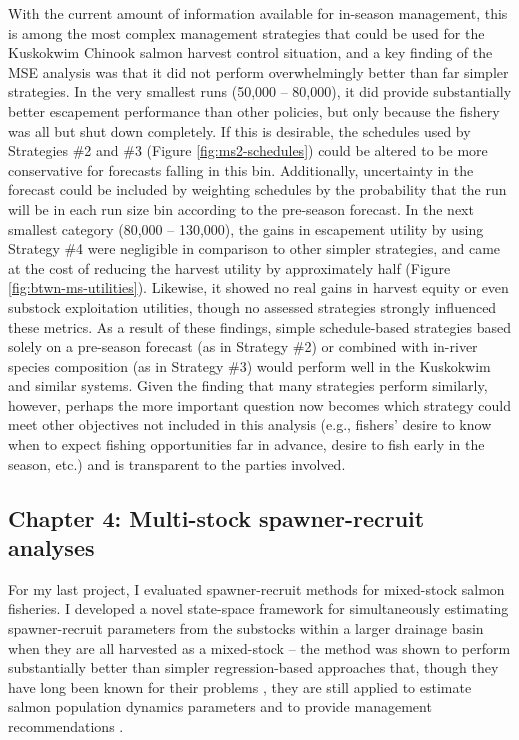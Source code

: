 \documentclass[12pt,]{book}
\theoremstyle{definition}
\theoremstyle{definition}
\theoremstyle{definition}
\theoremstyle{remark}
\begin{document}
With the current amount of information available for in-season
management, this is among the most complex management strategies that
could be used for the Kuskokwim Chinook salmon harvest control
situation, and a key finding of the MSE analysis was that it did not
perform overwhelmingly better than far simpler strategies. In the very
smallest runs (50,000 -- 80,000), it did provide substantially better
escapement performance than other policies, but only because the fishery
was all but shut down completely. If this is desirable, the schedules
used by Strategies \#2 and \#3 (Figure \ref{fig:ms2-schedules}) could be
altered to be more conservative for forecasts falling in this bin.
Additionally, uncertainty in the forecast could be included by weighting
schedules by the probability that the run will be in each run size bin
according to the pre-season forecast. In the next smallest category
(80,000 -- 130,000), the gains in escapement utility by using Strategy
\#4 were negligible in comparison to other simpler strategies, and came
at the cost of reducing the harvest utility by approximately half
(Figure \ref{fig:btwn-ms-utilities}). Likewise, it showed no real gains
in harvest equity or even substock exploitation utilities, though no
assessed strategies strongly influenced these metrics. As a result of
these findings, simple schedule-based strategies based solely on a
pre-season forecast (as in Strategy \#2) or combined with in-river
species composition (as in Strategy \#3) would perform well in the
Kuskokwim and similar systems. Given the finding that many strategies
perform similarly, however, perhaps the more important question now
becomes which strategy could meet other objectives not included in this
analysis (e.g., fishers' desire to know when to expect fishing
opportunities far in advance, desire to fish early in the season, etc.)
and is transparent to the parties involved.

\subsection{Chapter 4: Multi-stock spawner-recruit
analyses}\label{chapter-4-multi-stock-spawner-recruit-analyses}

\noindent
For my last project, I evaluated spawner-recruit methods for mixed-stock
salmon fisheries. I developed a novel state-space framework for
simultaneously estimating spawner-recruit parameters from the substocks
within a larger drainage basin when they are all harvested as a
mixed-stock -- the method was shown to perform substantially better than
simpler regression-based approaches that, though they have long been
known for their problems
\citep{ludwig-walters-1981, walters-1985, walters-martell-2004}, they
are still applied to estimate salmon population dynamics parameters and
to provide management recommendations
\citep{clark-etal-2009, korman-english-2013}.
\end{document}

